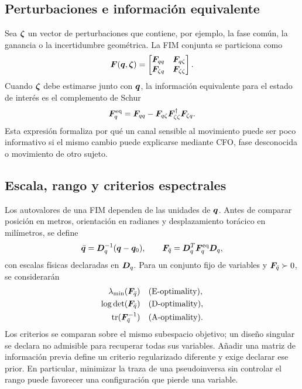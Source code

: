 \subsection{Perturbaciones e información equivalente}

Sea $\bm{\zeta}$ un vector de perturbaciones que contiene, por ejemplo, la fase común, la ganancia o la incertidumbre geométrica. La FIM conjunta se particiona como
\begin{equation}
\bm{F}(\bm{q},\bm{\zeta})=
\begin{bmatrix}
\bm{F}_{qq}&\bm{F}_{q\zeta}\\
\bm{F}_{\zeta q}&\bm{F}_{\zeta\zeta}
\end{bmatrix}.
\end{equation}
Cuando $\bm{\zeta}$ debe estimarse junto con $\bm{q}$, la información equivalente para el estado de interés es el complemento de Schur
\begin{equation}
\bm{F}_q^{\rm eq}=
\bm{F}_{qq}-
\bm{F}_{q\zeta}\bm{F}_{\zeta\zeta}^{\dagger}
\bm{F}_{\zeta q}.
\label{eq:equivalent_fim}
\end{equation}
Esta expresión formaliza por qué un canal sensible al movimiento puede ser poco informativo si el mismo cambio puede explicarse mediante CFO, fase desconocida o movimiento de otro sujeto.

\subsection{Escala, rango y criterios espectrales}

Los autovalores de una FIM dependen de las unidades de $\bm{q}$. Antes de comparar posición en metros, orientación en radianes y desplazamiento torácico en milímetros, se define
\begin{equation}
\bar{\bm{q}}=\bm{D}_q^{-1}(\bm{q}-\bm{q}_0),
\qquad
\bm{F}_{\bar q}=\bm{D}_q^T\bm{F}_q^{\rm eq}\bm{D}_q,
\label{eq:fim_normalization}
\end{equation}
con escalas físicas declaradas en $\bm{D}_q$. Para un conjunto fijo de variables
y $\bm{F}_{\bar q}\succ0$, se considerarán
\begin{align}
\lambda_{\min}(\bm{F}_{\bar q})
&\quad\text{(E-optimality)},\\
\log\det(\bm{F}_{\bar q})
&\quad\text{(D-optimality)},\\
\operatorname{tr}(\bm{F}_{\bar q}^{-1})
&\quad\text{(A-optimality)}.
\end{align}
Los criterios se comparan sobre el mismo subespacio objetivo; un diseño singular
se declara no admisible para recuperar todas sus variables. Añadir una matriz
de información previa define un criterio regularizado diferente y exige declarar
ese prior. En particular, minimizar la traza de una pseudoinversa sin controlar
el rango puede favorecer una configuración que pierde una variable.

